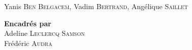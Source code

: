 \begin{titlepage}
\begin{center}
    	{\Large Yanis \textsc{Ben Belgacem}, Vadim \textsc{Bertrand}, Angélique \textsc{Saillet}}\\[1.5 cm]
    \end{center}

	\begin{center} \large
		    \textbf{Encadrés par}\\
			Adeline \textsc{Leclercq Samson}\\
			Frédéric \textsc{Audra}\\
	\end{center}
\end{titlepage}

\restoregeometry

\titleformat{\chapter}[display]
  {\normalfont\bfseries}{}{0pt}{\Large}